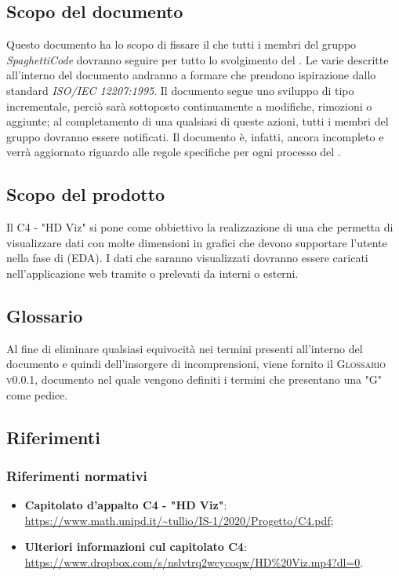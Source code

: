 \documentclass[../norme_di_progetto.tex]{subfiles}
\begin{document}
\subsection{Scopo del documento}
Questo documento ha lo scopo di fissare il  che tutti i membri del gruppo \emph{SpaghettiCode} dovranno seguire per tutto lo svolgimento del . Le varie  descritte all'interno del documento andranno a formare  che prendono ispirazione dallo standard \emph{ISO/IEC 12207:1995}. Il documento segue uno sviluppo di tipo incrementale, perciò sarà sottoposto continuamente a modifiche, rimozioni o aggiunte; al completamento di una qualsiasi di queste azioni, tutti i membri del gruppo dovranno essere notificati. Il documento è, infatti, ancora incompleto e verrà aggiornato riguardo alle regole specifiche per ogni processo del .

\subsection{Scopo del prodotto}
Il  C4 - "HD Viz" si pone come obbiettivo la realizzazione di una  che permetta di visualizzare dati con molte dimensioni in grafici che devono supportare l'utente nella fase di  (EDA).
I dati che saranno visualizzati dovranno essere caricati nell'applicazione web tramite  o prelevati da  interni o esterni.

\subsection{Glossario}
Al fine di eliminare qualsiasi equivocità nei termini presenti all'interno del documento e quindi dell'insorgere di incomprensioni, viene fornito il \textsc{Glossario v0.0.1}, documento nel quale vengono definiti i termini che presentano una "G" come pedice.

\subsection{Riferimenti}
\subsubsection{Riferimenti normativi}
\begin{itemize}
    \item \textbf{Capitolato d'appalto C4 - "HD Viz"}: \\
    \url{https://www.math.unipd.it/~tullio/IS-1/2020/Progetto/C4.pdf};
    \item \textbf{Ulteriori informazioni cul capitolato C4}: \\
    \url{https://www.dropbox.com/s/nslvtrq2wcycoqw/HD\%20Viz.mp4?dl=0}.
\end{itemize}
\end{document}

